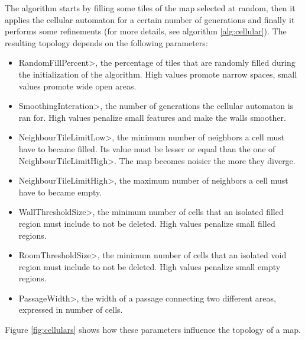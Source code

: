 \par

The algorithm starts by filling some tiles of the map selected at random, then it applies the cellular automaton for a certain number of generations and finally it performs some refinements (for more details, see algorithm \ref{alg:cellular}). The resulting topology depends on the following parameters:

\begin{itemize}
\item \<RandomFillPercent>, the percentage of tiles that are randomly filled during the initialization of the algorithm. High values promote narrow spaces, small values promote wide open areas.
\item \<SmoothingInteration>, the number of generations the cellular automaton is ran for. High values penalize small features and make the walls smoother. 
\item \<NeighbourTileLimitLow>, the minimum number of neighbors a cell must have to became filled. Its value must be lesser or equal than the one of \<NeighbourTileLimitHigh>. The map becomes noisier the more they diverge.
\item \<NeighbourTileLimitHigh>, the maximum number of neighbors a cell must have to became empty.
\item \<WallThresholdSize>, the minimum number of cells that an isolated filled region must include to not be deleted. High  values penalize small filled regions.
\item \<RoomThresholdSize>, the minimum number of cells that an isolated void region must include to not be deleted. High  values penalize small empty regions.
\item \<PassageWidth>, the width of a passage connecting two different areas, expressed in number of cells.
\end{itemize}

\par

Figure \ref{fig:cellulars} shows how these parameters influence the topology of a map.

